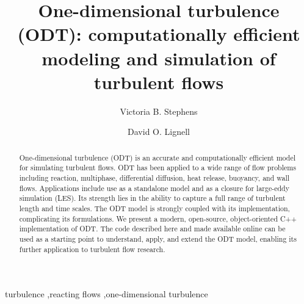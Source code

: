 \documentclass[preprint,12pt, a4paper]{elsarticle}
\begin{document}
\begin{frontmatter}



\title{One-dimensional turbulence (ODT): computationally efficient modeling and simulation of turbulent  flows}


\author{Victoria B. Stephens}
\author{David O. Lignell}


\address{Chemical Engineering Department, Brigham Young University, Provo, UT 84602, USA}

\begin{abstract}
%
One-dimensional turbulence (ODT) is an accurate and computationally efficient model for simulating turbulent flows. ODT has been applied to a wide range of flow problems including reaction, multiphase, differential diffusion, heat release, buoyancy, and wall flows. Applications include use as a standalone model and as a closure for large-eddy simulation (LES). Its strength lies in the ability to capture a full range of turbulent length and time scales. The ODT model is strongly coupled with its implementation, complicating its formulations. We present a modern, open-source, object-oriented C++ implementation of ODT. The code described here and made available online can be used as a starting point to understand, apply, and extend the ODT model, enabling its further application to turbulent flow research.
%
\end{abstract}

\begin{keyword}
turbulence \sep reacting flows \sep one-dimensional turbulence

\end{keyword}

\end{frontmatter}
\end{document}
